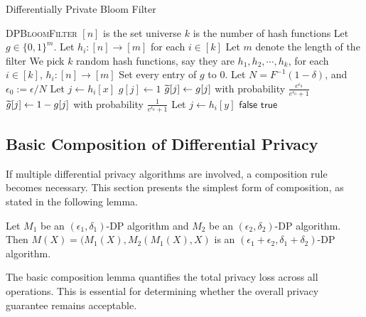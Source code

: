 \begin{algorithm}[!ht]\caption{Differentially Private Bloom Filter}\label{alg:init}
\begin{algorithmic}[1]
 \textsc{DPBloomFilter} 
\State  
{}
\State \hspace{4mm} $[n]$ is the set universe
\State \hspace{4mm} $k$ is the number of hash functions
\State \hspace{4mm} Let $g \in \{0,1\}^{m}$.
\State \hspace{4mm} Let $h_i : [n] \rightarrow [m]$ for each $i \in [k]$
\State
{} 
    \State Let $m$ denote the length of the filter
    \State We pick $k$ random hash functions, say they are $h_1, h_2, \cdots, h_k$, for each $i \in [k]$, $h_i : [n] \rightarrow [m]$
    \State Set every entry of $g$ to $0$.
    \State Let $N = F^{-1}(1 - \delta)$, and $\epsilon_0 := \epsilon / N$ 
            \State Let $j\gets h_i[x]$
            \State $g[j] \gets 1$
        \EndFor
    \EndFor 
        \State $\widetilde{g}[j] \gets g[j]$ with probability $\frac{e^{\epsilon_0}}{ e^{\epsilon_0} + 1}$
        \State $\widetilde{g}[j] \gets 1 - g[j]$ with probability $\frac{1}{ e^{\epsilon_0} + 1}$
    \EndFor    
\EndProcedure
\State
{} 
        \State Let $j\gets h_i[y]$
            \State \Return $\mathsf{false}$
        \EndIf
    \EndFor
    \State \Return $\mathsf{true}$
\EndProcedure
\State


\end{algorithmic}
\end{algorithm}

\subsection{Basic Composition of Differential Privacy}\label{sec:pre_def_bc}
If multiple differential privacy algorithms are involved, a composition rule becomes necessary. This section presents the simplest form of composition, as stated in the following lemma.
\begin{lemma}\label{lem:pre_com_lem}
    Let $M_1$ be an $(\epsilon_1,\delta_1)$-DP algorithm and $M_2$ be an $(\epsilon_2,\delta_2)$-DP algorithm. 
    Then $M(X) = (M_1(X),M_2(M_1(X),X)$ is an $(\epsilon_1+\epsilon_2,\delta_1+\delta_2)$-DP algorithm.
\end{lemma}
The basic composition lemma quantifies the total privacy loss across all operations. This is essential for determining whether the overall privacy guarantee remains acceptable.




